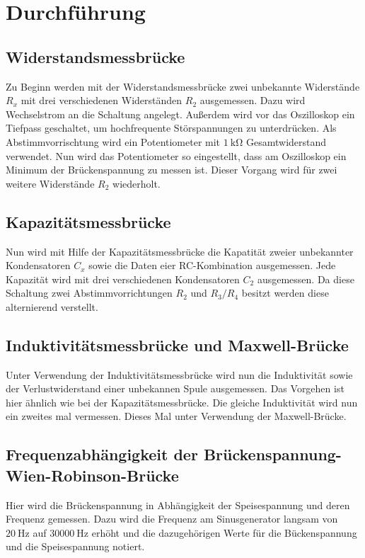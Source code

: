 \section{Durchführung}
\subsection{Widerstandsmessbrücke}
Zu Beginn werden mit der Widerstandsmessbrücke zwei unbekannte Widerstände $R_{x}$ mit
drei verschiedenen Widerständen $R_{2}$ ausgemessen.
Dazu wird Wechselstrom an die Schaltung angelegt. Außerdem wird vor das Oszilloskop
ein Tiefpass geschaltet, um hochfrequente Störspannungen zu unterdrücken.
Als Abstimmvorrischtung wird ein Potentiometer mit $\SI{1}{\kilo\ohm}$ Gesamtwiderstand
verwendet. Nun wird das Potentiometer so eingestellt, dass am Oszilloskop
ein Minimum der Brückenspannung zu messen ist. Dieser Vorgang wird für zwei weitere
Widerstände $R_{2}$ wiederholt.

\subsection{Kapazitätsmessbrücke}
Nun wird mit Hilfe der Kapazitätsmessbrücke die Kapatität zweier unbekannter
Kondensatoren $C_{x}$ sowie die Daten eier RC-Kombination ausgemessen. Jede Kapazität
wird mit drei verschiedenen Kondensatoren $C_{2}$ ausgemessen.
\noindent Da diese Schaltung zwei Abstimmvorrichtungen $R_{2}$ und $R_{3}/R_{4}$ besitzt werden diese
alternierend verstellt.

\subsection{Induktivitätsmessbrücke und Maxwell-Brücke}
\noindent Unter Verwendung der Induktivitätsmessbrücke wird nun die Induktivität sowie
der Verlustwiderstand einer unbekannen Spule ausgemessen. Das Vorgehen ist hier
ähnlich wie bei der Kapazitätsmessbrücke.
Die gleiche Induktivität wird nun ein zweites mal vermessen. Dieses Mal unter
Verwendung der Maxwell-Brücke.

\subsection{Frequenzabhängigkeit der Brückenspannung-Wien-Robinson-Brücke}
\noindent Hier wird die Brückenspannung in Abhängigkeit der Speisespannung und deren Frequenz gemessen.
Dazu wird die Frequenz am Sinusgenerator langsam von $\SI{20}{\Hz}$ auf $\SI{30000}{\Hz}$ erhöht und
die dazugehörigen Werte für die Bückenspannung und die Speisespannung notiert.





\label{sec:Durchführung}
